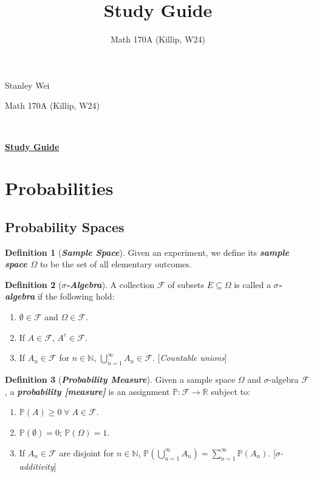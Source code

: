 \documentclass[12pt]{extarticle}
\title{\vspace{-3cm}Study Guide}
\date{Math 170A (Killip, W24)}
\newcommand{\pstart}[0]{\noindent}
\newcommand{\term}[1]{\textbf{\textit{#1}}}
\theoremstyle{definition}
\newtheorem*{definition}{Definition}
\theoremstyle{remark}
\begin{document}
\pstart Stanley Wei

\vspace{5pt}
\pstart Math 170A (Killip, W24)

~\\
\begin{center}
	\begin{large}
		\textbf{\ul{Study Guide}}
	\end{large}
\end{center}

\tableofcontents

\pagebreak
\section{Probabilities}
\subsection{Probability Spaces}
\begin{definition}[\term{Sample Space}]
    Given an experiment, we define its \term{sample space $\Omega$} to be 
the set of all elementary outcomes.
\end{definition}

\begin{tcolorbox}[colback=green!18!white]
    \begin{definition}[\term{$\sigma$-Algebra}]
        A collection $\mathcal{F}$ of subsets $E\subseteq\Omega$ is called 
a \term{$\sigma$-algebra} if the following hold: \begin{enumerate}
            \item $\emptyset\in\mathcal{F}$ and $\Omega\in\mathcal{F}$.
            \item If $A\in\mathcal{F}$, $A^c\in\mathcal{F}$.
            \item If $A_n\in\mathcal{F}$ for $n\in\mathbb{N}$, 
$\bigcup_{n=1}^\infty A_n\in\mathcal{F}$. [\textit{Countable unions}]
        \end{enumerate}
    \end{definition}
\end{tcolorbox}

\begin{tcolorbox}[colback=red!50!yellow!25!white]
    \begin{definition}[\term{Probability Measure}]
        Given a sample space $\Omega$ and $\sigma$-algebra $\mathcal{F}$, 
a \term{probability [measure]} is an assignment 
$\mathbb{P}:\mathcal{F}\to\mathbb{R}$ subject to: \begin{enumerate}
            \item $\mathbb{P}(A)\geq0\;\forall\;A\in\mathcal{F}$.
            \item $\mathbb{P}(\emptyset)=0$; $\mathbb{P}(\Omega)=1$.
            \item If $A_n\in\mathcal{F}$ are disjoint for 
$n\in\mathbb{N}$, $\mathbb{P}(\bigcup_{n=1}^\infty 
A_n)=\sum_{n=1}^\infty\mathbb{P}(A_n)$. [\textit{$\sigma$-additivity}]
        \end{enumerate}
    \end{definition}
\end{tcolorbox}
\end{document}
